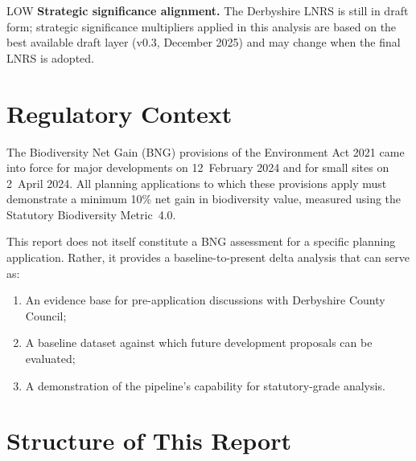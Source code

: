 \begin{confidencebox}{LOW}
\textbf{Strategic significance alignment.} The Derbyshire LNRS is still in draft form; strategic significance multipliers applied in this analysis are based on the best available draft layer (v0.3, December 2025) and may change when the final LNRS is adopted.
\end{confidencebox}

\section{Regulatory Context}

The Biodiversity Net Gain (BNG) provisions of the Environment Act 2021 came into force for major developments on 12~February 2024 and for small sites on 2~April 2024. All planning applications to which these provisions apply must demonstrate a minimum 10\% net gain in biodiversity value, measured using the Statutory Biodiversity Metric~4.0.

This report does not itself constitute a BNG assessment for a specific planning application. Rather, it provides a baseline-to-present delta analysis that can serve as:
\begin{enumerate}[nosep]
  \item An evidence base for pre-application discussions with Derbyshire County Council;
  \item A baseline dataset against which future development proposals can be evaluated;
  \item A demonstration of the \BDE{} pipeline's capability for statutory-grade analysis.
\end{enumerate}

\section{Structure of This Report}

